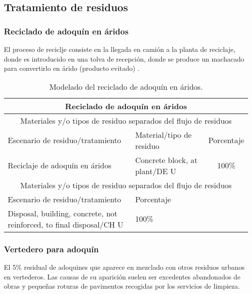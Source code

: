 \subsection{Tratamiento de residuos}
\subsubsection{Reciclado de adoquín en áridos}
El proceso de reciclje consiste en la llegada en camión a la planta de reciclaje, donde es introducido en una tolva de recepción, donde se produce un machacado para convertirlo en árido (producto evitado) \cite{monografia,gerd}.

\begin{table}[!htb]
\centering
\begin{tabular}{p{8cm}p{2cm}c}
\toprule
\multicolumn{3}{c}{Reciclado de adoquín en áridos}\\
\midrule
\multicolumn{3}{c}{Materiales y/o tipos de residuo separados del flujo de residuos}\\
\midrule
Escenario de residuo/tratamiento & Material/tipo de residuo & Porcentaje\\
\midrule
Reciclaje de adoquín en áridos & Concrete block, at plant/DE U & 100\%\\
\midrule
\multicolumn{3}{c}{Materiales y/o tipos de residuo separados del flujo de residuos}\\
\midrule
Escenario de residuo/tratamiento & Porcentaje & \\
\midrule
Disposal, building, concrete, not reinforced, to final disposal/CH U & 100\% & \\
\bottomrule
\end{tabular}
\caption{Modelado del reciclado de adoquín en áridos.}
\label{modeladorecicladoenaridos}
\end{table}

\subsubsection{Vertedero para adoquín}
El 5\% residual de adoquines que aparece en mezclado con otros residuos urbanos en vertederos. Las causas de su aparición suelen ser excedentes abandonados de obras y pequeñas roturas de pavimentos recogidas por los servicios de limpieza.

